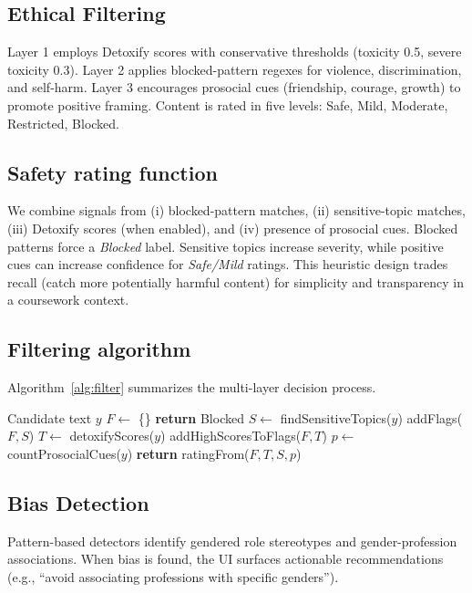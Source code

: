 \documentclass[conference]{IEEEtran}
\begin{document}
\subsection{Ethical Filtering}
Layer 1 employs Detoxify scores with conservative thresholds (toxicity 0.5, severe toxicity 0.3). Layer 2 applies blocked-pattern regexes for violence, discrimination, and self-harm. Layer 3 encourages prosocial cues (friendship, courage, growth) to promote positive framing. Content is rated in five levels: Safe, Mild, Moderate, Restricted, Blocked.

\subsection{Safety rating function}
We combine signals from (i) blocked-pattern matches, (ii) sensitive-topic matches, (iii) Detoxify scores (when enabled), and (iv) presence of prosocial cues. Blocked patterns force a \textit{Blocked} label. Sensitive topics increase severity, while positive cues can increase confidence for \textit{Safe/Mild} ratings. This heuristic design trades recall (catch more potentially harmful content) for simplicity and transparency in a coursework context.

\subsection{Filtering algorithm}
Algorithm~\ref{alg:filter} summarizes the multi-layer decision process.

\begin{algorithm}[t]
\caption{Multi-layer ethical filtering}
\label{alg:filter}
\begin{algorithmic}[1]
\REQUIRE Candidate text \(y\)
\STATE \(F \leftarrow\) \{\} 
  \STATE \textbf{return} Blocked
\ENDIF
\STATE \(S \leftarrow\) findSensitiveTopics(\(y\))
 \STATE addFlags(\(F,S\)) \ENDIF
{}
  \STATE \(T \leftarrow\) detoxifyScores(\(y\))
  \STATE addHighScoresToFlags(\(F,T\))
\ENDIF
\STATE \(p \leftarrow\) countProsocialCues(\(y\))
\STATE \textbf{return} ratingFrom(\(F,T,S,p\))
\end{algorithmic}
\end{algorithm}

\subsection{Bias Detection}
Pattern-based detectors identify gendered role stereotypes and gender-profession associations. When bias is found, the UI surfaces actionable recommendations (e.g., ``avoid associating professions with specific genders'').
\end{document}
